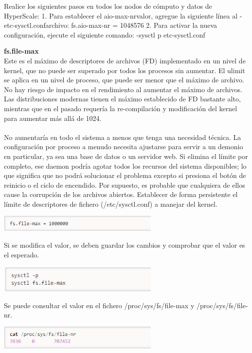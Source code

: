 Realice los siguientes pasos en todos los nodos de cómputo y datos de HyperScale:
1.	Para establecer el aio-max-nrvalor, agregue la siguiente línea al -etc-sysctl.confarchivo:
 fs.aio-max-nr = 1048576
2.	Para activar la nueva configuración, ejecute el siguiente comando:
 -sysctl p etc-sysctl.conf
 
\newpage

{\bfseries fs.file-max}\\

Este es el máximo de descriptores de archivos (FD) implementado en un nivel de kernel, que no puede ser superado por todos los procesos sin aumentar. El ulimit se aplica en un nivel de proceso, que puede ser menor que el máximo de archivo. No hay riesgo de impacto en el rendimiento al aumentar el máximo de archivos. Las distribuciones modernas tienen el máximo establecido de FD bastante alto, mientras que en el pasado requería la re-compilación y modificación del kernel para aumentar más allá de 1024. \\ \\
No aumentaría en todo el sistema a menos que tenga una necesidad técnica. La configuración por proceso a menudo necesita ajustarse para servir a un demonio en particular, ya sea una base de datos o un servidor web. 
Si elimina el límite por completo, ese daemon podría agotar todos los recursos del sistema disponibles; lo que significa que no podrá solucionar el problema excepto si presiona el botón de reinicio o el ciclo de encendido. Por supuesto, es probable que cualquiera de ellos cause la corrupción de los archivos abiertos.
Establecer de forma persistente el límite de descriptores de fichero (/etc/sysctl.conf) a manejar del kernel.
	\begin{center}
		\includegraphics[width=8cm]{./Imagenes/fsFileE1} 
	\end{center}
Si se modifica el valor, se deben guardar los cambios y comprobar que el valor es el esperado.
	\begin{center}
		\includegraphics[width=8cm]{./Imagenes/fsFileE2} 
	\end{center}
Se puede consultar el valor en el fichero /proc/sys/fs/file-max y /proc/sys/fs/file-nr.
	\begin{center}
		\includegraphics[width=8cm]{./Imagenes/fsFileE3} 
	\end{center}
